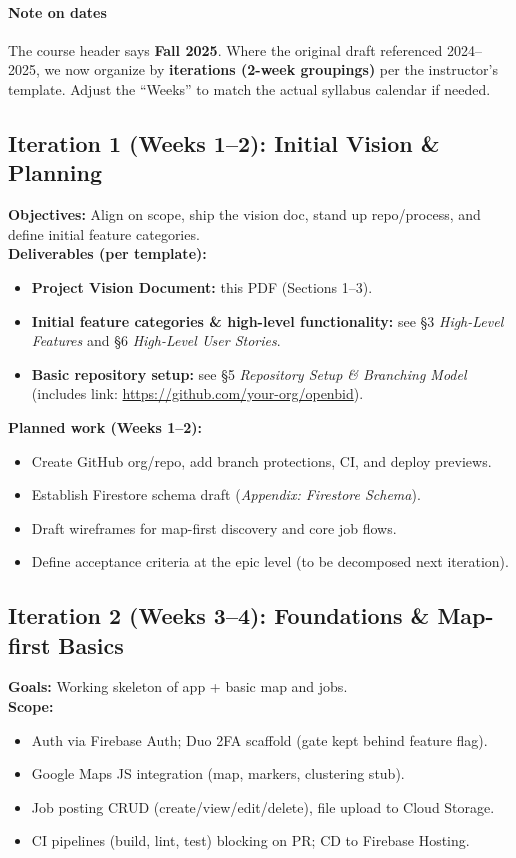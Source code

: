 \documentclass[11pt]{article}
\newcommand{\repoURL}{https://github.com/your-org/openbid}
\begin{document}
\paragraph{Note on dates}
The course header says \textbf{Fall 2025}. Where the original draft referenced 2024--2025, we now organize by \textbf{iterations (2-week groupings)} per the instructor’s template. Adjust the “Weeks” to match the actual syllabus calendar if needed.

\subsection*{Iteration 1 (Weeks 1--2): Initial Vision \& Planning}
\textbf{Objectives:} Align on scope, ship the vision doc, stand up repo/process, and define initial feature categories. \\
\textbf{Deliverables (per template):}
\begin{itemize}[leftmargin=1.4em]
  \item \textbf{Project Vision Document:} this PDF (Sections 1--3).
  \item \textbf{Initial feature categories \& high-level functionality:} see \S3 \emph{High-Level Features} and \S6 \emph{High-Level User Stories}.
  \item \textbf{Basic repository setup:} see \S5 \emph{Repository Setup \& Branching Model} (includes link: \href{\repoURL}{\repoURL}).
\end{itemize}
\textbf{Planned work (Weeks 1--2):}
\begin{itemize}[leftmargin=1.4em]
  \item Create GitHub org/repo, add branch protections, CI, and deploy previews.
  \item Establish Firestore schema draft (\emph{Appendix: Firestore Schema}).
  \item Draft wireframes for map-first discovery and core job flows.
  \item Define acceptance criteria at the epic level (to be decomposed next iteration).
\end{itemize}

\subsection*{Iteration 2 (Weeks 3--4): Foundations \& Map-first Basics}
\textbf{Goals:} Working skeleton of app + basic map and jobs. \\
\textbf{Scope:}
\begin{itemize}[leftmargin=1.4em]
  \item Auth via Firebase Auth; Duo 2FA scaffold (gate kept behind feature flag).
  \item Google Maps JS integration (map, markers, clustering stub).
  \item Job posting CRUD (create/view/edit/delete), file upload to Cloud Storage.
  \item CI pipelines (build, lint, test) blocking on PR; CD to Firebase Hosting.
\end{itemize}
\end{document}
